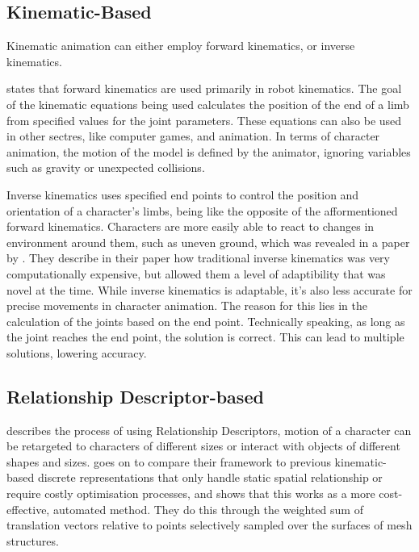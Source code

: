 \documentclass{l4proj}
\begin{document}
\subsection{Kinematic-Based}
Kinematic animation can either employ forward kinematics, or inverse kinematics.

\cite{Paul1981-ar} states that forward kinematics are used primarily in robot kinematics. The goal of the kinematic equations being used calculates the position of the end of a limb from specified values for the joint parameters. These equations can also be used in other sectres, like computer games, and animation. In terms of character animation, the motion of the model is defined by the animator, ignoring variables such as gravity or unexpected collisions.

Inverse kinematics uses specified end points to control the position and orientation of a character's limbs, being like the opposite of the afformentioned forward kinematics. Characters are more easily able to react to changes in environment around them, such as uneven ground, which was revealed in a paper by \cite{Lee1999}. They describe in their paper how traditional inverse kinematics was very computationally expensive, but allowed them a level of adaptibility that was novel at the time. While inverse kinematics is adaptable, it's also less accurate for precise movements in character animation. The reason for this lies in the calculation of the joints based on the end point. Technically speaking, as long as the joint reaches the end point, the solution is correct. This can lead to multiple solutions, lowering accuracy.

\subsection{Relationship Descriptor-based}
\cite{AlAsqhar2013} describes the process of using Relationship Descriptors, motion of a character can be retargeted to characters of different sizes or interact with objects of different shapes and sizes. \cite{AlAsqhar2013} goes on to compare their framework to previous kinematic-based discrete representations that only handle static spatial relationship or require costly optimisation processes, and shows that this works as a more cost-effective, automated method. They do this through the weighted sum of translation vectors relative to points selectively sampled over the surfaces of mesh structures.
\end{document}

